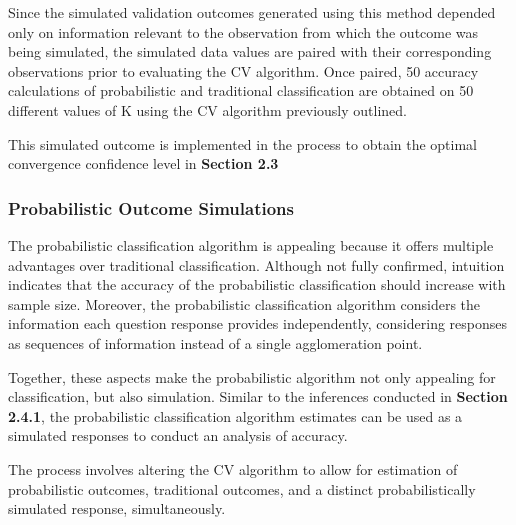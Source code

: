 \documentclass[12pt,]{article}
\begin{document}
Since the simulated validation outcomes generated using this method
depended only on information relevant to the observation from which the
outcome was being simulated, the simulated data values are paired with
their corresponding observations prior to evaluating the CV algorithm.
Once paired, 50 accuracy calculations of probabilistic and traditional
classification are obtained on 50 different values of K using the CV
algorithm previously outlined.

This simulated outcome is implemented in the process to obtain the
optimal convergence confidence level in \textbf{Section 2.3}

\hypertarget{probabilistic-outcome-simulations}{%
\subsubsection{Probabilistic Outcome
Simulations}\label{probabilistic-outcome-simulations}}

The probabilistic classification algorithm is appealing because it
offers multiple advantages over traditional classification. Although not
fully confirmed, intuition indicates that the accuracy of the
probabilistic classification should increase with sample size. Moreover,
the probabilistic classification algorithm considers the information
each question response provides independently, considering responses as
sequences of information instead of a single agglomeration point.

Together, these aspects make the probabilistic algorithm not only
appealing for classification, but also simulation. Similar to the
inferences conducted in \textbf{Section 2.4.1}, the probabilistic
classification algorithm estimates can be used as a simulated responses
to conduct an analysis of accuracy.

The process involves altering the CV algorithm to allow for estimation
of probabilistic outcomes, traditional outcomes, and a distinct
probabilistically simulated response, simultaneously.
\end{document}
